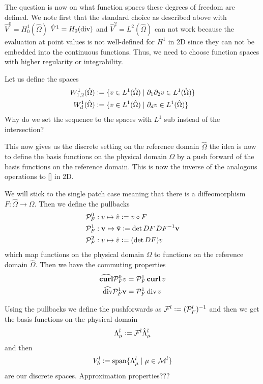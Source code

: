 \documentclass[../master_thesis.tex]{subfiles}
\begin{document}
The question is now  on what function spaces these degrees of freedom are defined. We note first that 
the standard choice as described above with $\hat{V}^0 = H^1_0(\hat{\Omega})$ 
$\hat{V}^1 = H_0(\operatorname{div})$ and $\hat{V}^2 = L^2(\hat{\Omega})$ can not work 
because the evaluation at point values is not well-defined for $H^1$ in 2D since 
they can not be embedded into the continuous functions. Thus, 
we need to choose function spaces with higher regularity or integrability.

Let us define the spaces
\begin{align*}
    W^1_{1,2}(\hat{\Omega}) &\vcentcolon= \{ v \in L^1(\hat{\Omega}) \mid \partial_1 \partial_2 v
        \in L^1(\hat{\Omega}) \}
    \\  W^1_d(\hat{\Omega}) &\vcentcolon= \{ v \in L^1(\hat{\Omega}) \mid \partial_d v
        \in L^1(\hat{\Omega}) \}
\end{align*}
{\color{red} Why do we set the sequence to the spaces with $L^1$ sub instead of the intersection?}


This now gives us the discrete setting on the reference domain $\hat{\Omega}$ the idea 
is now to define the basis functions on the physical domain $\Omega$ by a 
push forward of the basis functions on the reference domain.
This is now the inverse of the analogous operations to 
\ref{} in 2D. 

We will stick to the single patch case meaning that there is a diffeomorphism 
$F: \hat{\Omega} \rightarrow \Omega$. Then we define 
the pullbacks 
\begin{align*}
    &\mathcal{P}_F^0: v \mapsto \hat{v} \vcentcolon= v \circ F
    \\ &\mathcal{P}_F^1: \mathbf{v} \mapsto \hat{\mathbf{v}} \vcentcolon= \det DF \,DF^{-1} \mathbf{v}
    \\ &\mathcal{P}_F^2: v \mapsto \hat{v} \vcentcolon= (\det DF) v
\end{align*}
which map functions on the physical domain $\Omega$ to functions on the reference domain 
$\hat{\Omega}$. Then we have the commuting properties
\begin{align*}
    \widehat{\veccurl} \mathcal{P}_F^0 v &= \mathcal{P}_F^1 \veccurl v
    \\ \widehat{\diver} \mathcal{P}_F^1 \mathbf{v} &= \mathcal{P}_F^1 \diver v
\end{align*}

Using the pullbacks we define the pushforwards as 
$\mathcal{F}^l \vcentcolon= (\mathcal{P}_F^l)^{-1}$ and then 
we get the basis functions on the physical domain
\begin{align*}
    \Lambda^l_{\mu} \vcentcolon= \mathcal{F}^l \hat{\Lambda}^l_{\mu}
\end{align*}
and then 
\begin{align*}
    V_h^l \vcentcolon= \text{span} \{ \Lambda^l_{\mu} \mid \mu \in \mathcal{M}^l \}
\end{align*}
are our discrete spaces. {\color{red} Approximation properties???}
\end{document}
